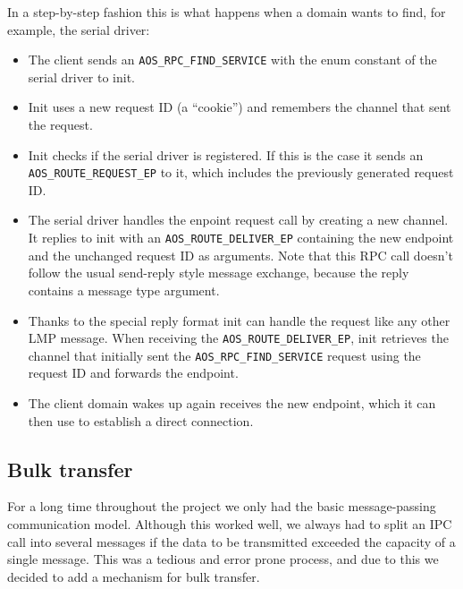\documentclass[a4paper,10pt]{article}
\begin{document}
In a step-by-step fashion this is what happens when a domain wants to find, for example, the serial driver:

\begin{itemize}
 \item The client sends an \lstinline!AOS_RPC_FIND_SERVICE! with the enum constant of the serial driver to init.
 \item Init uses a new request ID (a ``cookie'') and remembers the channel that sent the request.
 \item Init checks if the serial driver is registered. 
 If this is the case it sends an \lstinline!AOS_ROUTE_REQUEST_EP! to it, which includes the previously generated request ID.
 \item The serial driver handles the enpoint request call by creating a new channel.
 It replies to init with an \lstinline!AOS_ROUTE_DELIVER_EP! containing the new endpoint and the unchanged request ID as arguments.
 Note that this RPC call doesn't follow the usual send-reply style message exchange, because the reply contains a message type argument.
 \item Thanks to the special reply format init can handle the request like any other LMP message.
 When receiving the \lstinline!AOS_ROUTE_DELIVER_EP!, init retrieves the channel that initially sent the \lstinline!AOS_RPC_FIND_SERVICE! request using the request ID and forwards the endpoint.
 \item The client domain wakes up again receives the new endpoint, which it can then use to establish a direct connection.
\end{itemize}




\subsection{Bulk transfer}

For a long time throughout the project we only had the basic message-passing communication model.
Although this worked well, we always had to split an IPC call into several messages if the data to be transmitted exceeded the capacity of a single message.
This was a tedious and error prone process, and due to this we decided to add a mechanism for bulk transfer.
\end{document}
